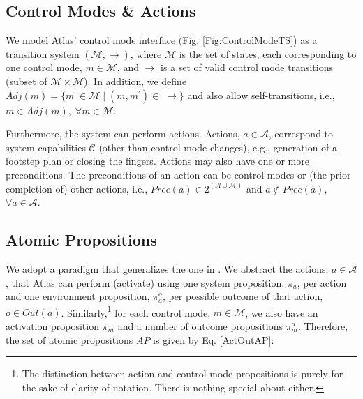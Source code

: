 
\subsection{Control Modes \& Actions}\label{S:CMActions}

We model Atlas' control mode interface (Fig. \ref{Fig:ControlModeTS}) as a transition system $(\mathcal{M}, \boldsymbol\rightarrow)$, where $\mathcal{M}$ is the set of states, each corresponding to one control mode, $m \in \mathcal{M}$, and $\boldsymbol\rightarrow$ is a set of valid control mode transitions (subset of $\mathcal{M} \times \mathcal{M}$).
In addition, we define $Adj(m) = \{ m^\prime \in \mathcal{M} \; | \; (m, m^\prime) \in \; \boldsymbol\rightarrow \}$ and also allow self-transitions, i.e., $m \in Adj(m), \; \forall m \in \mathcal{M}$.

Furthermore, the system can perform actions. Actions, $a \in \mathcal{A}$, correspond to system capabilities $\mathcal{C}$ (other than control mode changes), e.g., generation of a footstep plan or closing the fingers.
Actions may also have one or more preconditions.
The preconditions of an action can be control modes or (the prior completion of) other actions, i.e., $Prec(a) \in 2^{(\mathcal{A} \cup \mathcal{M})}$ and $a \not \in Prec(a)$, $\forall a \in \mathcal{A}$.

\subsection{Atomic Propositions}

We adopt a paradigm that generalizes the one in \cite{Vasu2013ICRA}.
We abstract the actions, $a \in \mathcal{A}$, that Atlas can perform (activate) using one system proposition, $\pi_a$, per action and one environment proposition, $\pi_a^o$, per possible outcome of that action, $o \in Out(a)$.
Similarly,\footnote{The distinction between action and control mode propositions is purely for the sake of clarity of notation. There is nothing special about either.}
for each control mode, $m \in \mathcal{M}$, we also have an activation proposition $\pi_m$ and a number of outcome propositions $\pi_m^o$.
Therefore, the set of atomic propositions $AP$ is given by Eq. \eqref{ActOutAP}:

